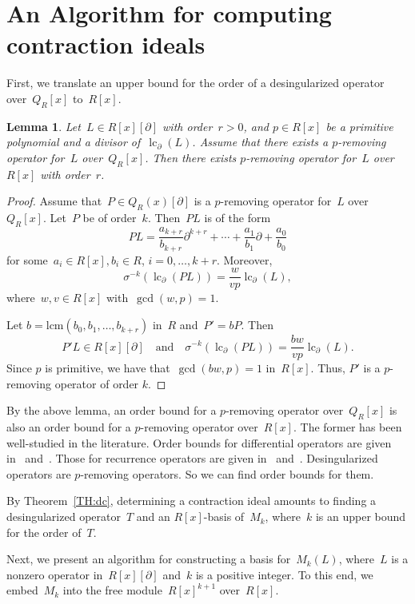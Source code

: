\documentclass{sig-alternate}
\newcommand{\lc}{\operatorname{lc}}
\newcommand{\si} { {\sigma}}
\newcommand{\pa}{\partial}
\newtheorem{lemma}[theorem]{Lemma}
\begin{document}
\section{An Algorithm for computing \\ contraction ideals} \label{SECT:algo}
First, we translate an upper bound for the order of a desingularized operator over~$Q_R[x]$ to~$R[x]$.
\begin{lemma} \label{LM:bound}
Let~$L {\in} R[x][\pa]$ with order~$r>0$, and $p {\in} R[x]$ be a primitive polynomial and a divisor of~$\lc_{\pa}(L)$.
Assume that there exists a $p$-removing operator for~$L$ over~$Q_R[x]$.
Then there exists $p$-removing operator for~$L$ over~$R[x]$ with order~$r$.
\end{lemma}
\begin{proof}
Assume that~$P \in Q_R(x)[\pa]$ is a $p$-removing operator for~$L$ over~$Q_R[x]$.
Let~$P$ be of order~$k$.
Then~$PL$ is of the form
\[
 PL = \frac{a_{k + r}}{b_{k +r}} \pa^{k + r} + \cdots + \frac{a_1}{b_1} \pa + \frac{a_0}{b_0}
\]
for some~$a_i \in R[x], b_i \in R$, $i = 0, \ldots, k + r$. Moreover,
\[ \sigma^{-k}\left(\lc_{\pa}(PL)\right) = \frac{w}{vp} \lc_\pa(L), \]
where~$w,v \in R[x]$ with~$\gcd(w, p)=1$.

Let $b = \text{lcm}(b_0, b_1, \ldots, b_{k + r})$ in~$R$ and~$P' = b P$.
Then
\[ P'L \in R[x][\pa] \quad \text{and} \quad \si^{-k}(\lc_{\pa}(PL)) = \frac{bw}{vp} \lc_{\pa}(L).\]
Since $p$ is primitive, we have that~$\gcd(bw, p) = 1$ in~$R[x]$.
Thus, $P'$ is a $p$-removing operator of order $k$.
\end{proof}


By the above lemma, an order bound for a $p$-removing operator over~$Q_R[x]$ is also an order bound for
a $p$-removing operator over~$R[x]$. The former has been well-studied in the literature.
Order bounds for differential operators are given in~\cite[Algorithm 3.4]{Tsai2000} and~\cite[Lemma 4.3.12]{Max2013}.
Those for recurrence operators are given in~\cite[Lemma 4]{Chen2013} and~\cite[Lemma 4.3.3]{Max2013}.
Desingularized operators are $p$-removing operators. So we can find order bounds for them.

By Theorem~\ref{TH:dc}, determining a contraction ideal
amounts to finding a desingularized
operator~$T$ and an $R[x]$-basis of~$M_k$, where~$k$ is an upper bound for the order of~$T$.

Next, we present an algorithm for constructing a basis for~$M_k(L)$, where~$L$ is a nonzero operator in~$R[x][\pa]$
and~$k$ is a positive integer. To this end, we embed~$M_k$ into the free module~$R[x]^{k+1}$ over~$R[x]$.
\end{document}
